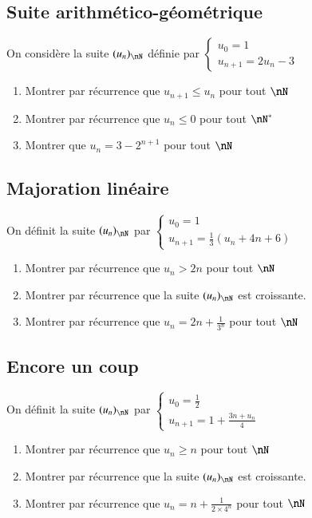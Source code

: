\documentclass[oneside,12pt]{article}          %
\begin{document}
\subsection{Suite arithmético-géométrique}
On considère la suite $(u_n)_{\nN}$ définie par $\begin{cases}u_0=1\\u_{n+1}=2u_n-3\end{cases}$
\begin{enumerate}
    \item Montrer par récurrence que $u_{n+1}\leq u_n$ pour tout $\nN$
    \item Montrer par récurrence que $u_n\leq0$ pour tout $\nN^*$
    \item Montrer que $u_n=3-2^{n+1}$ pour tout $\nN$
\end{enumerate}



\subsection{Majoration linéaire}
On définit la suite $(u_n)_{\nN}$ par $\begin{cases}u_0=1\\u_{n+1}=\frac{1}{3}(u_n+4n+6)\end{cases}$
\begin{enumerate}
    \item Montrer par récurrence que $u_n>2n$ pour tout $\nN$
    \item Montrer par récurrence que la suite $(u_n)_{\nN}$ est croissante.
    \item Montrer par récurrence que $u_n=2n+\frac{1}{3^n}$ pour tout $\nN$
\end{enumerate}



\subsection{Encore un coup}
On définit la suite $(u_n)_{\nN}$ par $\begin{cases}u_0=\frac{1}{2}\\u_{n+1}=1+\frac{3n+u_n}{4}\end{cases}$
\begin{enumerate}
    \item Montrer par récurrence que $u_n\geq n$ pour tout $\nN$
    \item Montrer par récurrence que la suite $(u_n)_{\nN}$ est croissante.
    \item Montrer par récurrence que $u_n=n+\frac{1}{2\times4^n}$ pour tout $\nN$
\end{enumerate}
\end{document}
